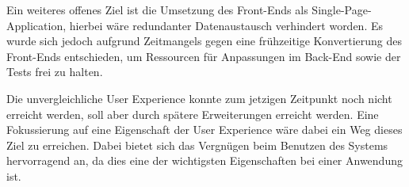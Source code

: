 Ein weiteres offenes Ziel ist die Umsetzung des Front-Ends als Single-Page-Application, hierbei wäre redundanter Datenaustausch verhindert worden.
Es wurde sich jedoch aufgrund Zeitmangels gegen eine frühzeitige Konvertierung des Front-Ends entschieden, um Ressourcen für Anpassungen im Back-End sowie der Tests frei zu halten.

Die unvergleichliche User Experience konnte zum jetzigen Zeitpunkt noch nicht erreicht werden, soll aber durch spätere Erweiterungen erreicht werden. 
Eine Fokussierung auf eine Eigenschaft der User Experience wäre dabei ein Weg dieses Ziel zu erreichen.
Dabei bietet sich das Vergnügen beim Benutzen des Systems hervorragend an, da dies eine der wichtigsten Eigenschaften bei einer Anwendung ist.